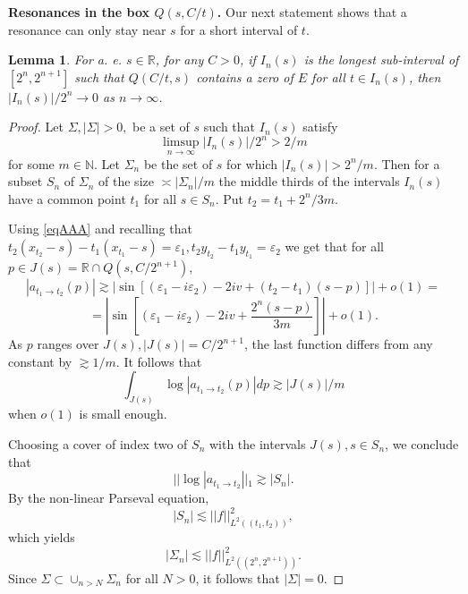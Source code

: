 \documentclass[11pt,twoside,reqno]{amsart}
\def\to{\rightarrow}
\def\R{{\mathbb R}}
\def\N{{\mathbb{N}}}
\def\e{\varepsilon}
\def\d{\delta}
\def\a{\alpha}
\theoremstyle{plain}
\newtheorem{lemma}{Lemma}
\numberwithin{equation}{section}
\begin{document}
$$$$

{\bf Resonances in the box $Q(s,C/t)$.} Our next statement shows that a resonance can only stay near $s$ for a short interval of $t$.


\begin{lemma}\label{corBox} For a. e. $s\in \R$, for any $C>0$, if $I_n(s)$ is the longest sub-interval of $[2^n,2^{n+1}]$  such that $Q(C/t,s)$ contains a zero of $E$ for all
	$t\in I_n(s)$, then $|I_n(s)|/2^n\to 0$ as $n\to\infty$. 
\end{lemma}


\begin{proof} Let $\Sigma, |\Sigma|>0,$ be a set of $s$ such that $I_n(s)$ satisfy
	$$\limsup_{n\to\infty}|I_n(s)|/2^n>2/m$$
	for some $m\in\N$. Let $\Sigma_n$ be the set of $s$ for which $|I_n(s)|>2^n/m$. Then for a subset $S_n$ of $\Sigma_n$ of the size
	$\asymp |\Sigma_n|/m$ the middle thirds of the  intervals $I_n(s)$ have a common point $t_1$ for all $s\in S_n$. Put $t_2=t_1+2^n/3m$.
	
	Using \eqref{eqAAA} and recalling that 
	$t_2(x_{t_2}-s)-t_1(x_{t_1}-s)=\e_1,  t_2y_{t_2}-t_1y_{t_1}=\e_2$ we get that for all $p\in J(s)=\R\cap Q(s,C/2^{n+1})$,
	$$
	|a_{t_1 \to t_2}(p)|\gtrsim |\sin[(\e_1 -i\e_2)  - 2iv+(t_2-t_1)(s-p)]|+o(1)= $$$$= |\sin[(\e_1 -i\e_2)  - 2iv+\frac{2^n(s-p)}{3m}]|+o(1).$$ 
	As $p$ ranges over $J(s), |J(s)|=C/2^{n+1}$, the last function differs from any constant by $\gtrsim 1/m$.
	It follows that 
	$$\int_{J(s)}\log|a_{t_1 \to t_2}(p)|dp\gtrsim |J(s)|/m$$
	when $o(1)$ is small enough. 
	
	Choosing a cover of index two of $S_n$ with the intervals $J(s), s\in S_n$, we conclude that 
	$$|| \log|a_{t_1 \to t_2} ||_1\gtrsim |S_n|.$$
	By the non-linear Parseval equation,
	$$|S_n|\lesssim ||f||^2_{L^2((t_1,t_2))},$$
	which yields
	$$|\Sigma_n|\lesssim ||f||^2_{L^2((2^n,2^{n+1}))}.$$
	Since $\Sigma\subset \cup_{n>N}\Sigma_n$ for all $N>0$, it follows that $|\Sigma|=0$.
	\end{proof}





\end{document}
